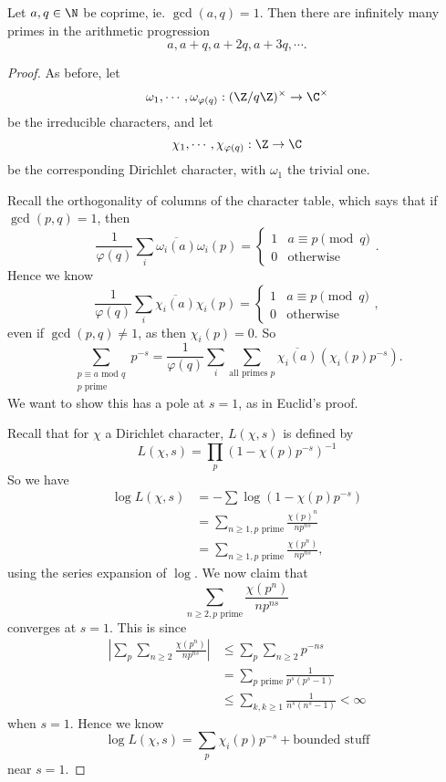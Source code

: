 \documentclass[a4paper]{article}
\begin{document}
\begin{thm}[Dirichlet, 1839]
  Let $a, q \in \N$ be coprime, ie. $\gcd(a, q) = 1$. Then there are infinitely many primes in the arithmetic progression
  \[
    a, a + q, a + 2q, a + 3q, \cdots.
  \]
\end{thm}

\begin{proof}
  As before, let
  \[
    \omega_1, \cdots, \omega_{\varphi(q)}: (\Z/q\Z)^\times \to \C^\times
  \]
  be the irreducible characters, and let
  \[
    \chi_1, \cdots, \chi_{\varphi(q)}: \Z \to \C
  \]
  be the corresponding Dirichlet character, with $\omega_1$ the trivial one.

  Recall the orthogonality of columns of the character table, which says that if $\gcd(p, q) = 1$, then
  \[
    \frac{1}{\varphi(q)} \sum_i \overline{\omega_i(a)} \omega_i(p) =
    \begin{cases}
      1 & a \equiv p \pmod q\\
      0 & \text{otherwise}
    \end{cases}.
  \]
  Hence we know
  \[
    \frac{1}{\varphi(q)} \sum_i \overline{\chi_i(a)} \chi_i(p) =
    \begin{cases}
      1 & a \equiv p \pmod q\\
      0 & \text{otherwise}
    \end{cases},
  \]
  even if $\gcd(p, q) \not= 1$, as then $\chi_i(p) = 0$. So
  \[
    \sum_{\substack{p \equiv a \text{ mod } q\\ p \text{ prime}}} p^{-s} = \frac{1}{\varphi(q)} \sum_i \sum_{\text{all primes } p} \overline{\chi_i(a)} (\chi_i(p) p^{-s}).\tag{$\ddagger$}
  \]
  We want to show this has a pole at $s = 1$, as in Euclid's proof.

  Recall that for $\chi$ a Dirichlet character, $L(\chi, s)$ is defined by
  \[
    L(\chi, s) = \prod_p (1 - \chi(p) p^{-s})^{-1}
  \]
  So we have
  \begin{align*}
    \log L(\chi, s) &= -\sum \log (1 - \chi(p) p^{-s})\\
    &= \sum_{n \geq 1, p\text{ prime}} \frac{\chi(p)^n}{n p^{ns}}\\
    &= \sum_{n \geq 1, p\text{ prime}} \frac{\chi(p^n)}{np^{ns}},
  \end{align*}
  using the series expansion of $\log$. We now claim that
  \[
    \sum_{n \geq 2, p\text{ prime}} \frac{\chi(p^n)}{np^{ns}}
  \]
  converges at $s = 1$. This is since
  \begin{align*}
    \left|\sum_p\sum_{n\geq 2} \frac{\chi(p^n)}{np^{ns}}\right| &\leq \sum_p \sum_{n \geq 2} p^{-ns} \\
    &= \sum_{p\text{ prime}} \frac{1}{p^s(p^s - 1)}\\
    &\leq \sum_{k, k \geq 1} \frac{1}{n^s(n^s - 1)} < \infty
  \end{align*}
  when $s = 1$. Hence we know
  \[
    \log L(\chi, s) = \sum_p \chi_i(p) p^{-s} + \text{bounded stuff}
  \]
  near $s = 1$.


\end{proof}
\end{document}
